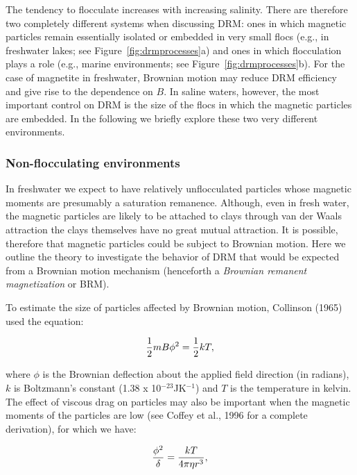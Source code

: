  The tendency to flocculate 
 increases with increasing salinity. 
There are therefore  two completely different systems when discussing DRM: ones in which magnetic particles remain essentially isolated  or embedded in very small flocs (e.g., in freshwater lakes; see Figure~\ref{fig:drmprocesses}a) and 
ones in which flocculation plays a role (e.g., marine environments; see Figure~\ref{fig:drmprocesses}b).   
For the case of magnetite in freshwater, Brownian motion may reduce DRM efficiency and give rise to the dependence on $B$.   In saline waters,  however, the most important control on DRM  is the size of the flocs in which the magnetic particles are embedded.      In the following we briefly explore these two very different environments.


\subsubsection{Non-flocculating environments}

In freshwater we expect to have relatively unflocculated particles whose magnetic moments are presumably a saturation remanence.    Although, even in fresh water, the magnetic particles are likely to be attached to clays through van der Waals attraction  the clays themselves have no great mutual attraction.    It is possible, therefore that magnetic particles could be subject to Brownian motion.   Here we outline the theory to investigate the behavior of DRM that would be expected from a Brownian motion mechanism (henceforth a
{\it  Brownian remanent magnetization}  or BRM).   

To estimate the size of particles affected by Brownian motion, 
\nocite{collinson65}
Collinson  (1965) used the equation:

\begin{equation}
{1\over 2} mB\phi^2 = {1\over 2} kT,
\label{eq:collinson}
\end{equation}

\noindent where $\phi$ is the Brownian deflection about the applied field direction (in radians), $k$ is Boltzmann's constant (1.38 x 10$^{-23}$JK$^{-1}$) and $T$ is the temperature in kelvin.    The effect of viscous drag on particles may also be important  when the magnetic moments of the particles are low  (see 
 \nocite{coffey96}
 Coffey et al., 1996 for a complete derivation), for which we have:

$$
{ {\phi^2}\over{\delta}}= {{kT}\over {4\pi \eta r^3}},
$$

